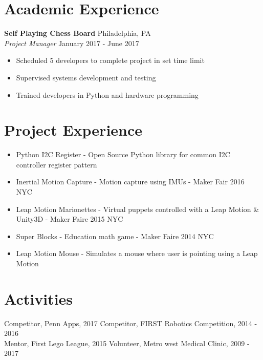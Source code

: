 \documentclass[10pt]{article}
\begin{document}
\begin{flushleft}
\section{Academic Experience}
	\textbf{Self Playing Chess Board} \hfill Philadelphia, PA \\
	\textit{Project Manager} \hfill January 2017 - June 2017 \\
	\begin{itemize}
		\item Scheduled 5 developers to complete project in set time limit
		\item Supervised systems development and testing
		\item Trained developers in Python and hardware programming
	\end{itemize}

\section{Project Experience}
	\begin{itemize}
		\item Python I2C Register - Open Source Python library for common I2C controller register pattern
		\item Inertial Motion Capture - Motion capture using IMUs - Maker Fair 2016 NYC
		\item Leap Motion Marionettes - Virtual puppets controlled with a Leap Motion \& Unity3D - Maker Faire 2015 NYC
		\item Super Blocks - Education math game - Maker Faire 2014 NYC
		\item Leap Motion Mouse - Simulates a mouse where user is pointing using a Leap Motion
	\end{itemize}

\section{Activities}
	Competitor, Penn Apps, 2017 \hfill Competitor, FIRST Robotics Competition, 2014 - 2016 \\
	Mentor, First Lego League, 2015 \hfill Volunteer, Metro west Medical Clinic, 2009 - 2017

\end{flushleft}
\end{document}
